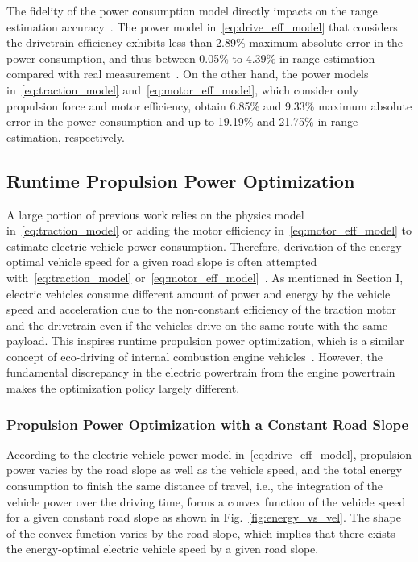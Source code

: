 The fidelity of the power consumption model directly impacts on the range estimation accuracy~\cite{Hong:ASPDAC16}. The power model in~\eqref{eq:drive_eff_model} that considers the drivetrain efficiency exhibits less than 2.89\% maximum absolute error in the power consumption, and thus between 0.05\% to 4.39\% in range estimation compared with real measurement~\cite{Hong:ASPDAC16}. On the other hand, the power models in~\eqref{eq:traction_model} and~\eqref{eq:motor_eff_model}, which consider only propulsion force and motor efficiency, obtain 6.85\% and 9.33\% maximum absolute error in the power consumption and up to 19.19\% and 21.75\% in range estimation, respectively.

\subsection{Runtime Propulsion Power Optimization} \label{subsec:propulsion_runtime_opt}

A large portion of previous work relies on the physics model in~\eqref{eq:traction_model} or adding the motor efficiency in~\eqref{eq:motor_eff_model} to estimate electric vehicle power consumption. Therefore, derivation of the energy-optimal vehicle speed for a given road slope is often attempted with~\eqref{eq:traction_model} or~\eqref{eq:motor_eff_model}~\cite{Wu:TR15,Vaz:JPS14,Lin:CCA14,Oliva:PHM13,Kachroudi:TVT12}.
As mentioned in Section I, electric vehicles consume different amount of power and energy by the vehicle speed and acceleration due to the non-constant efficiency of the traction motor and the drivetrain even if the vehicles drive on the same route with the same payload. This inspires runtime propulsion power optimization, which is a similar concept of eco-driving of internal combustion engine vehicles~\cite{Kamal:TITS11,Ozatay:IFAC14,Ozatay:TITS14,Khayyam:ESA12}. However, the fundamental discrepancy in the electric powertrain from the engine powertrain makes the optimization policy largely different.

\subsubsection{Propulsion Power Optimization with a Constant Road Slope} \label{subsubsec:opt_const_slope}

According to the electric vehicle power model in~\eqref{eq:drive_eff_model}, propulsion power varies by the road slope as well as the vehicle speed, and the total energy consumption to finish the same distance of travel, i.e., the integration of the vehicle power over the driving time, forms a convex function of the vehicle speed for a given constant road slope as shown in Fig.~\ref{fig:energy_vs_vel}. The shape of the convex function varies by the road slope, which implies that there exists the energy-optimal electric vehicle speed by a given road slope.

